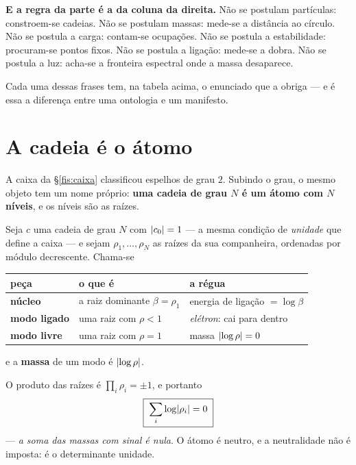 \documentclass[livro.tex]{subfiles}
\begin{document}
\medskip\noindent\textbf{E a regra da parte é a da coluna da direita.} Não se
postulam partículas: constroem-se cadeias. Não se postulam massas: mede-se a
distância ao círculo. Não se postula a carga: contam-se ocupações. Não se
postula a estabilidade: procuram-se pontos fixos. Não se postula a ligação:
mede-se a dobra. Não se postula a luz: acha-se a fronteira espectral onde a massa
desaparece.

\medskip\noindent Cada uma dessas frases tem, na tabela acima, o enunciado que a
obriga --- e é essa a diferença entre uma ontologia e um manifesto.

\section{A cadeia é o átomo}\label{fis:atomo}

\noindent A caixa da §\ref{fis:caixa} classificou espelhos de grau $2$. Subindo o
grau, o mesmo objeto tem um nome próprio: \textbf{uma cadeia de grau $N$ é um
átomo com $N$ níveis}, e os níveis são as raízes.

\begin{definicao}[o átomo]\label{fis:def:atomo}
Seja $c$ uma cadeia de grau $N$ com $\lvert c_0\rvert=1$ --- a mesma condição de
\emph{unidade} que define a caixa --- e sejam $\rho_1,\dots,\rho_N$ as raízes da
sua companheira, ordenadas por módulo decrescente. Chama-se
\begin{center}\small
\begin{tabular}{@{}lll@{}}
\toprule
peça & o que é & a régua \\
\midrule
\textbf{núcleo} & a raiz dominante $\beta=\rho_1$ & energia de ligação $=\log\beta$ \\
\textbf{modo ligado} & uma raiz com $\rho<1$ & \emph{elétron}: cai para dentro \\
\textbf{modo livre} & uma raiz com $\rho=1$ & massa $\lvert \log\rho\rvert=0$ \\
\bottomrule
\end{tabular}
\end{center}
e a \textbf{massa} de um modo é $\lvert \log\rho\rvert$.
\end{definicao}

\begin{proposicao}\label{fis:prop:neutro}
O produto das raízes é $\prod_i\rho_i=\pm1$, e portanto
\[
\boxed{\;\sum_i \log\lvert \rho_i\rvert=0\;}
\]
--- \emph{a soma das massas com sinal é nula}. O átomo é neutro, e a neutralidade
não é imposta: é o determinante unidade.
\end{proposicao}
\end{document}
